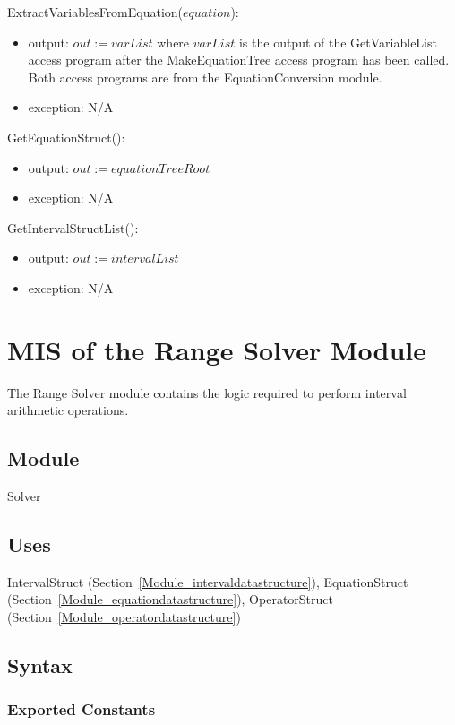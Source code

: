 \documentclass[12pt, titlepage]{article}
\begin{document}
\noindent ExtractVariablesFromEquation($equation$):
\begin{itemize}
	\item output: $out := varList$ where $varList$ is the output of the 
	GetVariableList access program after the MakeEquationTree access program 
	has been called. Both access programs are from the EquationConversion 
	module.
	\item exception: N/A
\end{itemize}

\noindent GetEquationStruct():
\begin{itemize}
	\item output: $out := equationTreeRoot$
	\item exception: N/A
\end{itemize}

\noindent GetIntervalStructList():
\begin{itemize}
	\item output: $out := intervalList$ 
	\item exception: N/A
\end{itemize}

\newpage

\section{MIS of the Range Solver Module} 
\label{Module_rangesolver}
The Range Solver module contains the logic required to perform interval 
arithmetic operations.

\subsection{Module}

Solver

\subsection{Uses}

IntervalStruct (Section~\ref{Module_intervaldatastructure}), EquationStruct 
(Section~\ref{Module_equationdatastructure}), OperatorStruct (Section~\ref{Module_operatordatastructure})

\subsection{Syntax}

\subsubsection{Exported Constants}
\end{document}
